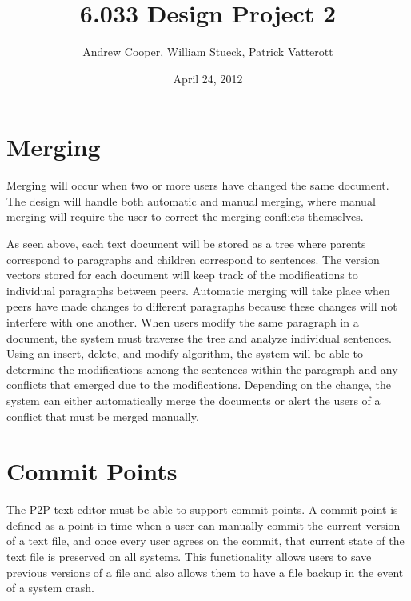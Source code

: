 \documentclass{6033dp1/6033dp1}
\title{6.033 Design Project 2}
\author{Andrew Cooper, William Stueck, Patrick Vatterott}
\date{April 24, 2012}
\begin{document}
\maketitle




\section{Merging}
Merging will occur when two or more users have changed the same document. The design will handle both automatic and manual merging, where manual merging will require the user to correct the merging conflicts themselves.

As seen above, each text document will be stored as a tree where parents correspond to paragraphs and children correspond to sentences. The version vectors stored for each document will keep track of the modifications to individual paragraphs between peers. Automatic merging will take place when peers have made changes to different paragraphs because these changes will not interfere with one another. When users modify the same paragraph in a document, the system must traverse the tree and analyze individual sentences. Using an insert, delete, and modify algorithm, the system will be able to determine the modifications among the sentences within the paragraph and any conflicts that emerged due to the modifications. Depending on the change, the system can either automatically merge the documents or alert the users of a conflict that must be merged manually.

\section{Commit Points}
The P2P text editor must be able to support commit points. A commit point is defined as a point in time when a user can manually commit the current version of a text file, and once every user agrees on the commit, that current state of the text file is preserved on all systems.  This functionality allows users to save previous versions of a file and also allows them to have a file backup in the event of a system crash.
\end{document}
